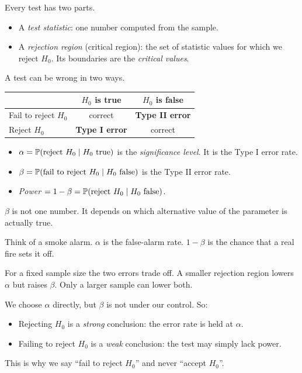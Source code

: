 Every test has two parts.
\begin{itemize}
  \item A \emph{test statistic}: one number computed from the sample.
  \item A \emph{rejection region} (critical region): the set of statistic values for which we reject $H_0$. Its boundaries are the \emph{critical values}.
\end{itemize}

A test can be wrong in two ways.

\begin{definition}
\begin{center}
\begin{tabular}{lcc}
\toprule
 & $H_0$ is true & $H_0$ is false \\
\midrule
Fail to reject $H_0$ & correct & \textbf{Type II error} \\
Reject $H_0$ & \textbf{Type I error} & correct \\
\bottomrule
\end{tabular}
\end{center}
\begin{itemize}
  \item $\alpha=\mathbb{P}(\text{reject }H_0\mid H_0\text{ true})$ is the \emph{significance level}. It is the Type I error rate.
  \item $\beta=\mathbb{P}(\text{fail to reject }H_0\mid H_0\text{ false})$ is the Type II error rate.
  \item \emph{Power} $=1-\beta=\mathbb{P}(\text{reject }H_0\mid H_0\text{ false})$.
\end{itemize}
$\beta$ is not one number. It depends on which alternative value of the parameter is actually true.
\end{definition}

\begin{intuition}
Think of a smoke alarm. $\alpha$ is the false-alarm rate. $1-\beta$ is the chance that a real fire sets it off.

For a fixed sample size the two errors trade off. A smaller rejection region lowers $\alpha$ but raises $\beta$. Only a larger sample can lower both.

We choose $\alpha$ directly, but $\beta$ is not under our control. So:
\begin{itemize}
  \item Rejecting $H_0$ is a \emph{strong} conclusion: the error rate is held at $\alpha$.
  \item Failing to reject $H_0$ is a \emph{weak} conclusion: the test may simply lack power.
\end{itemize}
This is why we say ``fail to reject $H_0$'' and never ``accept $H_0$''.
\end{intuition}

